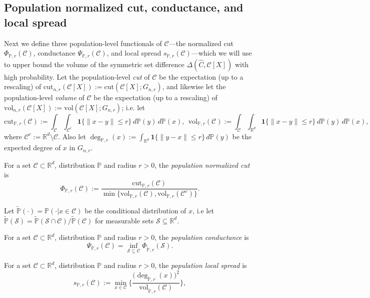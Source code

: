 \documentclass[11pt,twoside]{article}
\newcommand{\Reals}{\mathbb{R}}
\newcommand{\1}{\mathbf{1}}
\newcommand{\Rd}{\Reals^d}
\newcommand{\mc}[1]{\mathcal{#1}}
\newcommand{\mbb}[1]{\mathbb{#1}}
\newcommand{\Pbb}{\mathbb{P}}
\newcommand{\wt}[1]{\widetilde{#1}}
\newcommand{\wh}[1]{\widehat{#1}}
\newcommand{\vol}{\mathrm{vol}}
\newcommand{\cut}{\mathrm{cut}}
\begin{document}
\subsection{Population normalized cut, conductance, and local spread}
Next we define three population-level functionals of $\mc{C}$---the normalized cut $\Phi_{\Pbb,r}(\mc{C})$, conductance $\Psi_{\Pbb,r}(\mc{C})$, and local spread $s_{\Pbb,r}(\mc{C})$---which we will use to upper bound the volume of the symmetric set difference $\Delta(\wh{C},\mc{C}[X])$ with high probability. Let the population-level \emph{cut} of $\mc{C}$ be the expectation (up to a rescaling) of $\cut_{n,r}(\mc{C}[X]) := \cut(\mc{C}[X]; G_{n,r})$,  and likewise let the population-level \emph{volume} of $\mc{C}$ be the expectation (up to a rescaling) of $\vol_{n,r}(\mc{C}[X]) := \vol(\mc{C}[X]; G_{n,r})$; i.e. let
\begin{equation*}
\mathrm{cut}_{\Pbb,r}(\mc{C}) := \int_{\mc{C}} \int_{\mc{C}^c} \1\{\|x - y\| \leq r\} \,d\Pbb(y) \,d\Pbb(x),~~ \mathrm{vol}_{\Pbb,r}(\mc{C}) := \int_{\mc{C}} \int_{\Rd} \1\{\|x - y\| \leq r\} \,d\Pbb(y) \,d\Pbb(x),
\end{equation*}
where $\mc{C}^c := \Rd \!\setminus\! \mc{C}$. Also let $\deg_{\Pbb,r}(x) := \int_{\Rd} \1\{\|y - x\| \leq r\} \,d\Pbb(y)$ be the expected degree of $x$ in $G_{n,r}$. 
\begin{definition}
	For a set $\mc{C} \subset \Rd$, distribution $\Pbb$ and radius $r > 0$, the \emph{population normalized cut} is
	\begin{equation}
	\label{eqn:population_normalized_cut}
	\Phi_{\Pbb,r}(\mc{C}) := \frac{\mathrm{cut}_{\Pbb,r}(\mc{C})}{\min\{\mathrm{vol}_{\Pbb,r}(\mc{C}), \mathrm{vol}_{\Pbb,r}(\mc{C}^c)\}}.
	\end{equation}
\end{definition}

Let $\wt{\mathbb{P}}(\cdot) = \mathbb{P}(\cdot|x \in \mc{C})$ be the conditional distribution of $x$, i.e let $\wt{\mbb{P}}(\mc{S}) = \wt{\Pbb}(\mc{S} \cap \mc{C})/\wt{\Pbb}(\mc{C})$ for measurable sets $\mc{S} \subseteq \Rd$.

\begin{definition}
	For a set $\mc{C} \subset \Rd$, distribution $\Pbb$ and radius $r > 0$, the \emph{population conductance} is
	\begin{equation}
	\label{eqn:population_conductance}
	\Psi_{\mathbb{P},r}(\mc{C}) = \inf_{\mc{S} \subseteq \mc{C}} \Phi_{\wt{\Pbb},r}(\mc{S}).
	\end{equation}
\end{definition}
\begin{definition}
	For a set $\mc{C} \subset \Rd$, distribution $\Pbb$ and radius $r > 0$, the \emph{population local spread} is
	\begin{equation}
	\label{eqn:local_spread}
	s_{\Pbb,r}(\mc{C}) := \min_{x \in \mc{C}} \biggl\{\frac{\bigl(\deg_{\wt{\Pbb},r}(x)\bigr)^2}{\vol_{\wt{\Pbb},r}(\mc{C})} \biggr\},
	\end{equation}
\end{definition}
\end{document}
